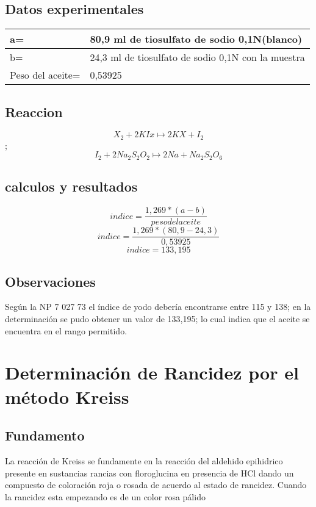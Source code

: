 \documentclass[a4paper,12pt]{article} %
\begin{document}
\subsection{Datos experimentales} 
\begin{table}[H]
\begin{tabular}{@{}|l|l|@{}}
\toprule
a=               & 80,9 ml de tiosulfato de sodio 0,1N(blanco)        \\ \midrule
b=               & 24,3 ml de tiosulfato de sodio 0,1N con la muestra \\ \midrule
Peso del aceite= & 0,53925                                            \\ \bottomrule
\end{tabular}
\end{table}

\subsection{Reaccion}
\[X_2+2KIx \mapsto 2KX+I_2\];\[I_2+2Na_2S_2O_2\mapsto 2Na+Na_2S_2O_6\]
\subsection{calculos y resultados}
\[indice=\frac{1,269*(a-b)}{peso del aceite}\]
\[indice=\frac{1,269*(80,9-24,3)}{0,53925}\]
\[indice=133,195\]
\subsection{Observaciones}
Según la NP 7 027 73 el índice de yodo debería encontrarse entre 115 y 138; en la determinación se pudo obtener un valor de 133,195; lo cual indica que el aceite se encuentra en el rango permitido.



\newpage

\section{Determinación de Rancidez por el método Kreiss}


\subsection{Fundamento}
La reacción de Kreiss se fundamente en la reacción del aldehido epihidrico presente en sustancias rancias con floroglucina en presencia de HCl dando un compuesto de coloración roja o rosada de acuerdo al estado de rancidez.
Cuando la rancidez esta empezando es de un color rosa pálido
\end{document}
